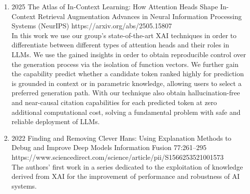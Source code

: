     
        \begin{enumerate}[resume]

            \item {}
                {2025}
                {The Atlas of In-Context Learning: How Attention Heads Shape In-Context Retrieval Augmentation}
                {Advances in Neural Information Processing Systems (NeurIPS)}
                {}
                {https://arxiv.org/abs/2505.15807}
                {
                    \\In this work we use our group's state-of-the-art XAI techniques in order to differentiate between different types of attention heads and their roles in LLMs. We use the gained insights in order to obtain reproducible control over the generation process via the isolation of function vectors. We further gain the capability predict whether a candidate token ranked highly for prediction is grounded  in context or in parametric knowledge, allowing users to select a preferred generation path. With our technique also obtain hallucination-free and near-causal citation capabilities for each predicted token at zero additional computational cost, solving a fundamental problem with safe and reliable deployment of LLMs.
                }
        
        
            \item
                            {2022}
                            {Finding and Removing Clever Hans: Using Explanation Methods to Debug and Improve Deep Models}
                            {Information Fusion}
                            {77:261--295}
                            {https://www.sciencedirect.com/science/article/pii/S1566253521001573}
                            {\\
                            The authors' first work in a series dedicated to the exploitation of knowledge derived from XAI for the improvement of performance and robustness of AI systems.}


\end{enumerate}
